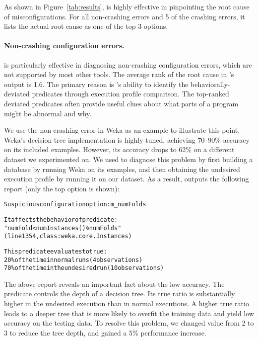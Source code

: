 
As shown in Figure~\ref{tab:results},
\ourtool is highly effective in pinpointing the root cause of
misconfigurations. For all \noncrash non-crashing errors
and 5 of the \crash crashing errors, it lists the actual root cause as one of the top 3 options. 


\paragraph{Non-crashing configuration errors.}

\ourtool is particularly effective in diagnosing non-crashing configuration
errors,
which are not supported by most other tools.
The average rank of the root cause
in \ourtool's output is 1.6.
The primary reason is
\ourtool's ability to identify the behaviorally-deviated predicates through
execution profile comparison. The top-ranked deviated predicates often provide
useful clues about what parts of a program might be abnormal and why.

We use the non-crashing error in Weka as an example to illustrate
this point. 
Weka's decision tree implementation is highly tuned, achieving 70--90\% accuracy on
its included examples. However, its accuracy drops to 62\%
on a different dataset we experimented on. We used \ourtool to diagnose this
problem by first building a database by running Weka on its examples, and
then
obtaining the undesired execution profile by running it on our dataset. As a result,
\ourtool outputs the following report (only the top option is shown):

\vspace{-1mm}

\begin{CodeOut}
\begin{alltt} 
  Suspicious configuration option: m\_numFolds

  It affects the behavior of predicate:
  "numFold < numInstances() \% numFolds"
  (line 1354, class: weka.core.Instances) 

  This predicate evaluates to true:
    20\% of the time in normal runs (4 observations)
    70\% of the time in the undesired run (10 observations)

\end{alltt}
\end{CodeOut}

\vspace{-4mm}

The above report reveals an important fact about the low accuracy.
The predicate  controls
the depth of a decision tree. Its
true ratio is substantially higher in the undesired execution
than in normal executions. A higher true ratio leads
to a deeper tree that is more likely to overfit the training
data and yield low accuracy on the testing data.
To resolve this problem, we changed 
value from 2 to 3 to reduce the tree depth, and
gained a 5\% performance increase.

